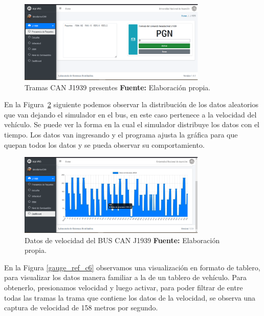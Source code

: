 \begin{figure}[H]
	\centering
	\includegraphics[width=0.8\textwidth]{./Cap6imagen/paquetes_fig_c6.png}
	\caption [Tramas CAN J1939 presentes.]{Tramas CAN J1939 presentes \textbf{ Fuente:} %
		Elaboración propia.}
	\label{paquetes_ref_c6} %
\end{figure}


En la Figura~\ref{real_ref_c6} siguiente podemos observar la distribución de los datos aleatorios que van dejando el simulador en el bus, en este caso pertenece a la velocidad del vehículo. 
Se puede ver la forma en la cual el simulador distribuye los datos con el tiempo.  
Los datos van ingresando y el programa ajusta la gráfica para que quepan todos los datos y se pueda observar su comportamiento.  

\begin{figure}[H]
	\centering
	\includegraphics[width=0.8\textwidth]{./Cap6imagen/real_fig_c6.png}
	\caption [Datos de Velocidad del BUS CAN J1939.]{Datos de velocidad del BUS CAN J1939 \textbf{ Fuente:} %
		Elaboración propia.}
	\label{real_ref_c6} %
\end{figure}


En la Figura \ref{gauge_ref_c6} observamos una visualización en formato de tablero, para visualizar los datos manera familiar a la de un tablero de vehículo. 
Para obtenerlo, presionamos velocidad y luego activar, para poder filtrar de entre todas las tramas la trama que contiene los datos de la velocidad, se observa una captura de velocidad de 158 metros por segundo. 


